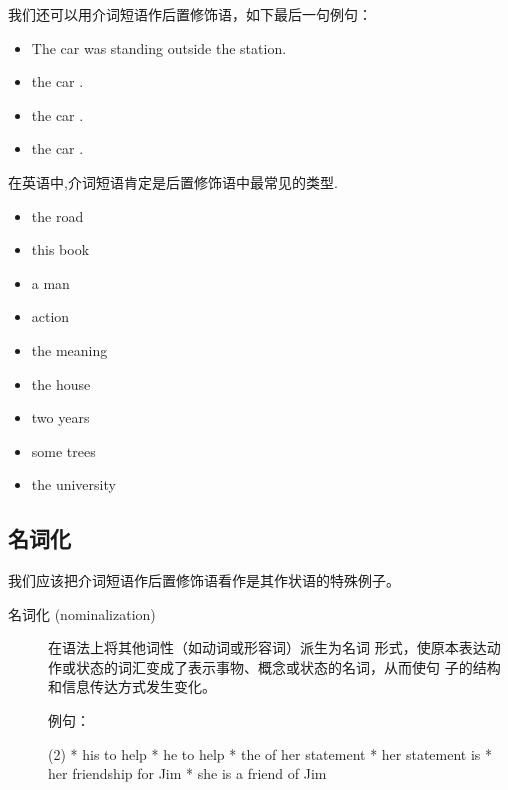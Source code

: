 我们还可以用介词短语作后置修饰语，如下最后一句例句：
\begin{itemize}
\item The car was standing outside the station.
\item the car .
\item the car .
\item the car .
\end{itemize}

在英语中,介词短语肯定是后置修饰语中最常见的类型.

\begin{itemize}
\item the road 
\item this book 
\item a man 
\item action 
\item the meaning 
\item the house 
\item two years 
\item some trees 
\item the university 
\end{itemize}

\subsection{名词化}

我们应该把介词短语作后置修饰语看作是其作状语的特殊例子。

\begin{description}
\item[名词化 (nominalization)] 在语法上将其他词性（如动词或形容词）派生为名词
  形式，使原本表达动作或状态的词汇变成了表示事物、概念或状态的名词，从而使句
  子的结构和信息传达方式发生变化。


  例句：
  \begin{taskitem}(2)
    * his  to help
    * he  to help
    * the  of her statement
    * her statement is 
    * her friendship for Jim
    * she is a friend of Jim
  \end{taskitem}
\end{description}

